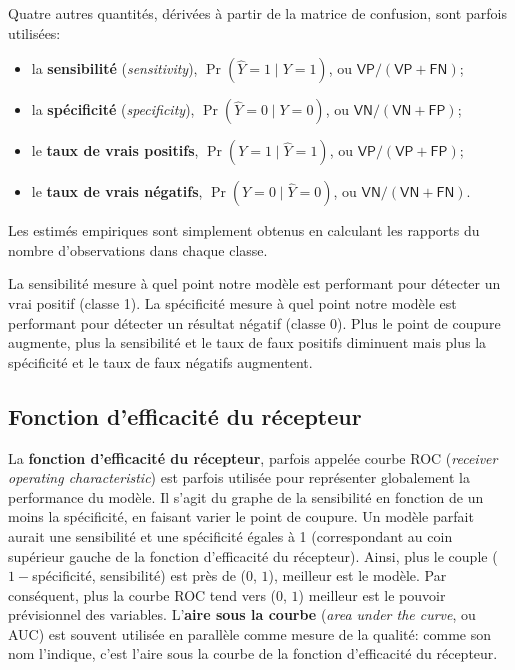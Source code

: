 \documentclass[
  11pt,
  letterpaper,
]{scrbook}
\providecommand{\tightlist}{%
  \setlength{\itemsep}{0pt}\setlength{\parskip}{0pt}}\usepackage{longtable,booktabs,array}
\theoremstyle{definition}
\theoremstyle{remark}
\begin{document}
Quatre autres quantités, dérivées à partir de la matrice de confusion,
sont parfois utilisées:

\begin{itemize}
\tightlist
\item
  la \textbf{sensibilité} (\emph{sensitivity}),
  \(\Pr(\widehat{Y}=1 \mid Y=1)\), ou
  \(\mathsf{VP}/(\mathsf{VP}+\mathsf{FN})\);
\item
  la \textbf{spécificité} (\emph{specificity}),
  \(\Pr(\widehat{Y}=0 \mid Y=0)\), ou
  \(\mathsf{VN}/(\mathsf{VN}+\mathsf{FP})\);
\item
  le \textbf{taux de vrais positifs}, \(\Pr(Y=1 \mid \widehat{Y}=1)\),
  ou \(\mathsf{VP}/(\mathsf{VP}+\mathsf{FP})\);
\item
  le \textbf{taux de vrais négatifs}, \(\Pr(Y=0 \mid \widehat{Y}=0)\),
  ou \(\mathsf{VN}/(\mathsf{VN}+\mathsf{FN})\).
\end{itemize}

Les estimés empiriques sont simplement obtenus en calculant les rapports
du nombre d'observations dans chaque classe.

La sensibilité mesure à quel point notre modèle est performant pour
détecter un vrai positif (classe 1). La spécificité mesure à quel point
notre modèle est performant pour détecter un résultat négatif (classe
0). Plus le point de coupure augmente, plus la sensibilité et le taux de
faux positifs diminuent mais plus la spécificité et le taux de faux
négatifs augmentent.

\hypertarget{fonction-defficacituxe9-du-ruxe9cepteur}{%
\subsection{Fonction d'efficacité du
récepteur}\label{fonction-defficacituxe9-du-ruxe9cepteur}}

La \textbf{fonction d'efficacité du récepteur}, parfois appelée courbe
ROC (\emph{receiver operating characteristic}) est parfois utilisée pour
représenter globalement la performance du modèle. Il s'agit du graphe de
la sensibilité en fonction de un moins la spécificité, en faisant varier
le point de coupure. Un modèle parfait aurait une sensibilité et une
spécificité égales à 1 (correspondant au coin supérieur gauche de la
fonction d'efficacité du récepteur). Ainsi, plus le couple
(\(1-\)spécificité, sensibilité) est près de (\(0\), \(1\)), meilleur
est le modèle. Par conséquent, plus la courbe ROC tend vers (\(0\),
\(1\)) meilleur est le pouvoir prévisionnel des variables.
L'\textbf{aire sous la courbe} (\emph{area under the curve}, ou AUC) est
souvent utilisée en parallèle comme mesure de la qualité: comme son nom
l'indique, c'est l'aire sous la courbe de la fonction d'efficacité du
récepteur.
\end{document}
